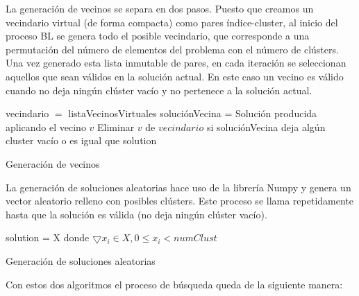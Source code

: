La generación de vecinos se separa en dos pasos. Puesto que creamos un vecindario virtual (de forma compacta) como pares índice-cluster, al inicio del proceso BL se genera todo el posible vecindario, que corresponde a una permutación del número de elementos del problema con el número de clústers.
Una vez generado esta lista inmutable de pares, en cada iteración se seleccionan aquellos que sean válidos en la solución actual. En este caso un vecino es válido cuando no deja ningún clúster vacío y no pertenece a la solución actual. \\

\begin{algorithm}[H]
    \SetAlgoLined
        vecindario $=$ listaVecinosVirtuales \;
         {
            soluciónVecina = Solución producida aplicando el vecino $v$ \;
            Eliminar $v$ de $vecindario$ si soluciónVecina deja algún cluster vacío o es igual que solution \;
        }
    \caption{Generación de vecinos}
\end{algorithm}

\vspace{\baselineskip}

La generación de soluciones aleatorias hace uso de la librería Numpy y genera un vector aleatorio relleno con posibles clústers. Este proceso se llama repetidamente hasta que la solución es válida (no deja ningún clúster vacío). \\

\begin{algorithm}[H]
    \SetAlgoLined
         {
            solution = X donde $\bigtriangledown x_i \in X, 0 \leq x_i < numClust $ \;
        }
    \caption{Generación de soluciones aleatorias}
\end{algorithm}

\newpage

Con estos dos algoritmos el proceso de búsqueda queda de la siguiente manera: \\

